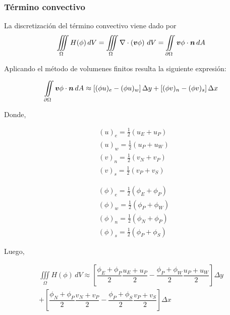 \subsubsection{Término convectivo}

La discretización del término convectivo viene dado por
\begin{equation}
\iiint\limits_{\Omega} H(\phi) \, dV = \iiint\limits_{\Omega} \nabla \cdot \left( \boldsymbol{v} \phi \right) \, dV = \iint\limits_{\partial \Omega} \boldsymbol{v} \phi \cdot \boldsymbol{n} \, dA
\end{equation}

Aplicando el método de volumenes finitos resulta la siguiente expresión:

\begin{equation}
\iint\limits_{\partial \Omega} \boldsymbol{v} \phi \cdot \boldsymbol{n} \, dA \approx \left[ (\phi u)_e -(\phi u)_w \right] \Delta y + \left[ (\phi v)_n -(\phi v)_s \right] \Delta x
\end{equation}

Donde,

\begin{equation}
\begin{split}
&(u)_e = \frac{1}{2}(u_E+u_P) \\
&(u)_w = \frac{1}{2}(u_P+u_W) \\
&(v)_n = \frac{1}{2}(v_N+v_P) \\
&(v)_s = \frac{1}{2}(v_P+v_S)
\end{split}
\end{equation}

\begin{equation}
\begin{split}
&(\phi)_e = \frac{1}{2}(\phi_E+\phi_P) \\
&(\phi)_w = \frac{1}{2}(\phi_P+\phi_W) \\
&(\phi)_n = \frac{1}{2}(\phi_N+\phi_P) \\
&(\phi)_s = \frac{1}{2}(\phi_P+\phi_S)
\end{split}
\end{equation}

Luego,

\begin{equation}
\begin{split}
\iiint\limits_{\Omega} H(\phi) \, dV \approx \left[ \dfrac{\phi_E+\phi_P}{2} \dfrac{u_E+u_P}{2} - \dfrac{\phi_P+\phi_W}{2} \dfrac{u_P+u_W}{2} \right] \Delta y \\
+ \left[ \dfrac{\phi_N+\phi_P}{2} \dfrac{v_N+v_P}{2} - \dfrac{\phi_P+\phi_S}{2} \dfrac{v_P+v_S}{2} \right] \Delta x 
\end{split}
\end{equation}

